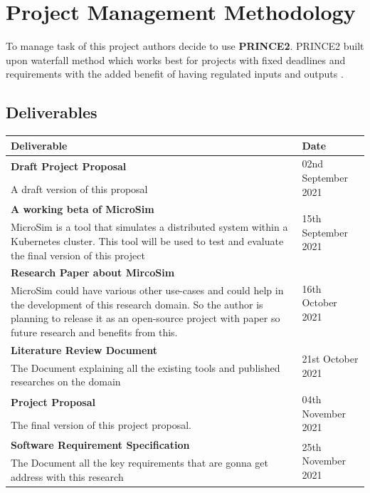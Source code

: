 
{\let\clearpage\relax \chapter{Project Management Methodology}}

To manage task of this project authors decide to use \textbf{PRINCE2}. PRINCE2 built upon waterfall method which works best for projects with fixed deadlines and requirements with the added benefit of having regulated inputs and outputs \citep{WhatAreT79:online}.

\section{Deliverables}
\setlength\LTleft{0mm}
\begin{longtable}{|p{115mm}|p{35mm}|}
\hline
\textbf{Deliverable} & \textbf{Date} \\ \hline
\textbf{Draft Project Proposal} & \multirow{2}{*}{02nd September 2021} \\
A draft version of this proposal &  \\ \hline
\textbf{A working beta of MicroSim}\label{microsim} & \multirow{2}{*}{15th September 2021} \\
MicroSim is a tool that simulates a distributed system within a Kubernetes cluster. This tool will be used to test and evaluate the final version of this project &  \\ \hline
\textbf{Research Paper about MircoSim} & \multirow{2}{*}{16th October 2021} \\
MicroSim could have various other use-cases and could help in the development of this research domain. So the author is planning to release it as an open-source project with paper so future research and benefits from this. &  \\ \hline
\textbf{Literature Review Document} & \multirow{2}{*}{21st October 2021} \\
The Document explaining all the existing tools and published researches on the domain &  \\ \hline
\textbf{Project Proposal} & \multirow{2}{*}{04th November 2021} \\
The final version of this project proposal. &  \\ \hline
\textbf{Software Requirement Specification} & \multirow{2}{*}{25th November 2021} \\
The Document all the key requirements that are gonna get address with this research &  \\ \hline

\end{longtable}
